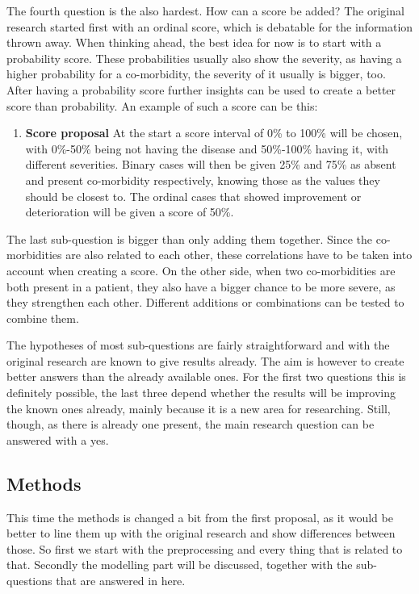 \documentclass[10pt,a4paper]{article}
\begin{document}
	The fourth question is the also hardest. How can a score be added? The original research started first with an ordinal score, which is debatable for the information thrown away. When thinking ahead, the best idea for now is to start with a probability score. These probabilities usually also show the severity, as having a higher probability for a co-morbidity, the severity of it usually is bigger, too. After having a probability score further insights can be used to create a better score than probability. An example of such a score can be this:
	
	\begin{enumerate}
		\item[] \textbf{Score proposal} At the start a score interval of 0\% to 100\% will be chosen, with 0\%-50\% being not having the disease and 50\%-100\% having it, with different severities. Binary cases will then be given 25\% and 75\% as absent and present co-morbidity respectively, knowing those as the values they should be closest to. The ordinal cases that showed improvement or deterioration will be given a score of 50\%. 
	\end{enumerate}
	
	The last sub-question is bigger than only adding them together. Since the co-morbidities are also related to each other, these correlations have to be taken into account when creating a score. On the other side, when two co-morbidities are both present in a patient, they also have a bigger chance to be more severe, as they strengthen each other. Different additions or combinations can be tested to combine them.
	
	The hypotheses of most sub-questions are fairly straightforward and with the original research are known to give results already. The aim is however to create better answers than the already available ones. For the first two questions this is definitely possible, the last three depend whether the results will be improving the known ones already, mainly because it is a new area for researching. Still, though, as there is already one present, the main research question can be answered with a yes.
	
	\subsection{Methods}
	\label{subsec:FinalMethods}
	
	This time the methods is changed a bit from the first proposal, as it would be better to line them up with the original research and show differences between those. So first we start with the preprocessing and every thing that is related to that. Secondly the modelling part will be discussed, together with the sub-questions that are answered in here.
	
\end{document}
